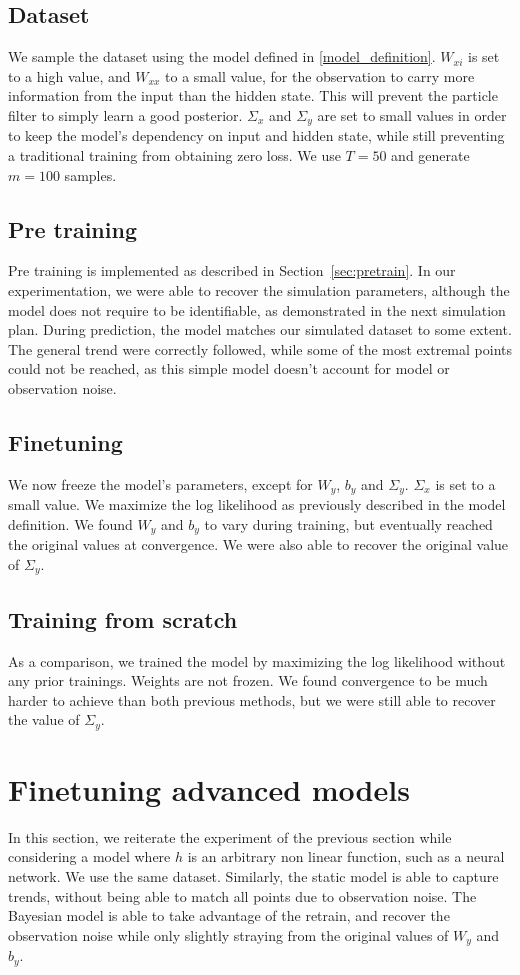 \documentclass[10pt,a4paper]{report}
\begin{document}
\subsection{Dataset}
We sample the dataset using the model defined in \ref{model_definition}.
$W_{xi}$ is set to a high value, and $W_{xx}$ to a small value, for the observation to carry more information from the input than the hidden state.
This will prevent the particle filter to simply learn a good posterior.
$\Sigma_x$ and $\Sigma_y$ are set to small values in order to keep the model's dependency on input and hidden state, while still preventing a traditional training from obtaining zero loss.
We use $T=50$ and generate $m=100$ samples.

\subsection{Pre training}
Pre training is implemented as described in Section~\ref{sec:pretrain}.
In our experimentation, we were able to recover the simulation parameters, although the model does not require to be identifiable, as demonstrated in the next simulation plan.
During prediction, the model matches our simulated dataset to some extent.
The general trend were correctly followed, while some of the most extremal points could not be reached, as this simple model doesn't account for model or observation noise.

\subsection{Finetuning}
We now freeze the model's parameters, except for $W_y$, $b_y$ and $\Sigma_y$.
$\Sigma_x$ is set to a small value.
We maximize the log likelihood as previously described in the model definition.
We found $W_y$ and $b_y$ to vary during training, but eventually reached the original values at convergence.
We were also able to recover the original value of $\Sigma_y$.

\subsection{Training from scratch}
As a comparison, we trained the model by maximizing the log likelihood without any prior trainings.
Weights are not frozen.
We found convergence to be much harder to achieve than both previous methods, but we were still able to recover the value of $\Sigma_y$.

\section{Finetuning advanced models}
In this section, we reiterate the experiment of the previous section while considering a model where $h$ is an arbitrary non linear function, such as a neural network.
We use the same dataset.
Similarly, the static model is able to capture trends, without being able to match all points due to observation noise.
The Bayesian model is able to take advantage of the retrain, and recover the observation noise while only slightly straying from the original values of $W_y$ and $b_y$.
\end{document}

